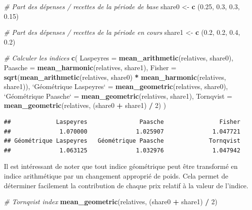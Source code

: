 \documentclass[]{article}
\newenvironment{Shaded}{\begin{snugshade}}{\end{snugshade}}
\newcommand{\CommentTok}[1]{\textcolor[rgb]{0.56,0.35,0.01}{\textit{#1}}}
\newcommand{\DataTypeTok}[1]{\textcolor[rgb]{0.13,0.29,0.53}{#1}}
\newcommand{\DecValTok}[1]{\textcolor[rgb]{0.00,0.00,0.81}{#1}}
\newcommand{\FloatTok}[1]{\textcolor[rgb]{0.00,0.00,0.81}{#1}}
\newcommand{\KeywordTok}[1]{\textcolor[rgb]{0.13,0.29,0.53}{\textbf{#1}}}
\newcommand{\NormalTok}[1]{#1}
\newcommand{\OperatorTok}[1]{\textcolor[rgb]{0.81,0.36,0.00}{\textbf{#1}}}
\newcommand{\StringTok}[1]{\textcolor[rgb]{0.31,0.60,0.02}{#1}}
\begin{document}
\begin{Shaded}
\begin{Highlighting}[]
\CommentTok{# Part des dépenses / recettes de la période de base}
\NormalTok{share0 <-}\StringTok{ }\KeywordTok{c}\NormalTok{ (}\FloatTok{0.25}\NormalTok{, }\FloatTok{0.3}\NormalTok{, }\FloatTok{0.3}\NormalTok{, }\FloatTok{0.15}\NormalTok{)}

\CommentTok{# Part des dépenses / recettes de la période en cours}
\NormalTok{share1 <-}\StringTok{ }\KeywordTok{c}\NormalTok{ (}\FloatTok{0.2}\NormalTok{, }\FloatTok{0.2}\NormalTok{, }\FloatTok{0.4}\NormalTok{, }\FloatTok{0.2}\NormalTok{)}

\CommentTok{# Calculer les indices}
\KeywordTok{c}\NormalTok{(}
  \DataTypeTok{Laspeyres =} \KeywordTok{mean_arithmetic}\NormalTok{(relatives, share0),}
  \DataTypeTok{Paasche =} \KeywordTok{mean_harmonic}\NormalTok{(relatives, share1),}
  \DataTypeTok{Fisher =} \KeywordTok{sqrt}\NormalTok{(}\KeywordTok{mean_arithmetic}\NormalTok{(relatives, share0) }\OperatorTok{*}\StringTok{ }\KeywordTok{mean_harmonic}\NormalTok{(relatives, share1)),}
  \StringTok{`}\DataTypeTok{Géométrique Laspeyres}\StringTok{`}\NormalTok{ =}\StringTok{ }\KeywordTok{mean_geometric}\NormalTok{(relatives, share0),}
  \StringTok{`}\DataTypeTok{Géométrique Paasche}\StringTok{`}\NormalTok{ =}\StringTok{ }\KeywordTok{mean_geometric}\NormalTok{(relatives, share1),}
  \DataTypeTok{Tornqvist =} \KeywordTok{mean_geometric}\NormalTok{(relatives, (share0 }\OperatorTok{+}\StringTok{ }\NormalTok{share1) }\OperatorTok{/}\StringTok{ }\DecValTok{2}\NormalTok{)}
\NormalTok{)}
\end{Highlighting}
\end{Shaded}

\begin{verbatim}
##             Laspeyres               Paasche                Fisher 
##              1.070000              1.025907              1.047721 
## Géométrique Laspeyres   Géométrique Paasche             Tornqvist 
##              1.063125              1.032976              1.047942
\end{verbatim}

Il est intéressant de noter que tout indice géométrique peut être transformé en indice arithmétique par un changement approprié de poids. Cela permet de déterminer facilement la contribution de chaque prix relatif à la valeur de l'indice.

\begin{Shaded}
\begin{Highlighting}[]
\CommentTok{# Tornqvist index}
\KeywordTok{mean_geometric}\NormalTok{(relatives, (share0 }\OperatorTok{+}\StringTok{ }\NormalTok{share1) }\OperatorTok{/}\StringTok{ }\DecValTok{2}\NormalTok{) }
\end{Highlighting}
\end{Shaded}
\end{document}
